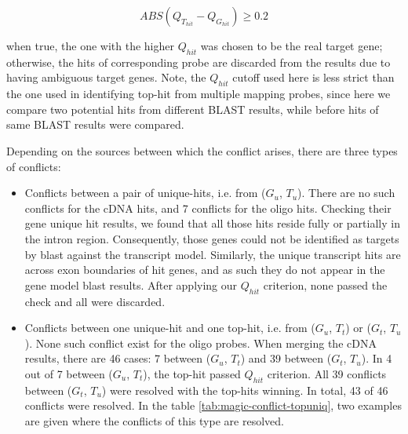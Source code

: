\begin{equation}
ABS(Q_{T_{hit}}-Q_{G_{hit}}) \geq 0.2
\end{equation}

when true, the one with the higher $Q_{hit}$ was chosen to be the real target 
gene; 
otherwise, the hits of corresponding probe are discarded from the results due 
to having ambiguous target genes. 
Note, the $Q_{hit}$ cutoff used here is less strict than the one used in 
identifying top-hit from multiple mapping probes, since here we compare two 
potential hits from different BLAST results, while before hits of same BLAST 
results were compared.

Depending on the sources between which the conflict arises, there are three 
types of conflicts:

\begin{itemize}
\item Conflicts between a pair of unique-hits, i.e. from ($G_u$, $T_u$). There 
are no such conflicts for the cDNA hits, and 7 conflicts for the oligo hits. 
Checking their gene unique hit results, we found that all those hits reside 
fully or partially in the intron region. 
Consequently, those genes could not be identified as targets by blast against 
the transcript model. 
Similarly, the unique transcript hits are across exon boundaries of hit genes, 
and as such they do not appear in the gene model blast results. 
After applying our $Q_{hit}$ criterion, none passed the check and all  
were discarded. 

\item  Conflicts between one unique-hit and one top-hit, i.e. from ($G_u$, 
$T_t$) or ($G_t$, $T_u$). None such conflict exist for the oligo probes. 
When merging the cDNA results, there are 46 cases: 7 between ($G_u$, 
$T_t$) and 39 between ($G_t$, $T_u$).
In 4 out of 7 between ($G_u$, $T_t$), the top-hit passed $Q_{hit}$ 
criterion. All 39 conflicts between ($G_t$, $T_u$) were resolved 
with the top-hits winning.
In total, 43 of 46 conflicts were resolved.
In the table \ref{tab:magic-conflict-topuniq}, two examples are given 
where the conflicts of this type are resolved. 



\end{itemize}
